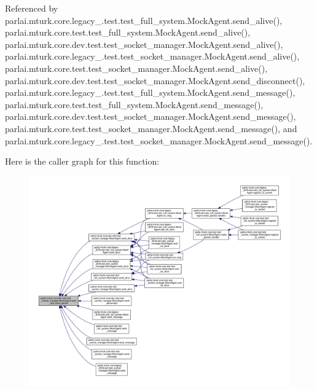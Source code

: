 Referenced by parlai.\+mturk.\+core.\+legacy\+\_.\+test.\+test\+\_\+full\+\_\+system.\+Mock\+Agent.\+send\+\_\+alive(), parlai.\+mturk.\+core.\+test.\+test\+\_\+full\+\_\+system.\+Mock\+Agent.\+send\+\_\+alive(), parlai.\+mturk.\+core.\+dev.\+test.\+test\+\_\+socket\+\_\+manager.\+Mock\+Agent.\+send\+\_\+alive(), parlai.\+mturk.\+core.\+legacy\+\_.\+test.\+test\+\_\+socket\+\_\+manager.\+Mock\+Agent.\+send\+\_\+alive(), parlai.\+mturk.\+core.\+test.\+test\+\_\+socket\+\_\+manager.\+Mock\+Agent.\+send\+\_\+alive(), parlai.\+mturk.\+core.\+dev.\+test.\+test\+\_\+socket\+\_\+manager.\+Mock\+Agent.\+send\+\_\+disconnect(), parlai.\+mturk.\+core.\+legacy\+\_.\+test.\+test\+\_\+full\+\_\+system.\+Mock\+Agent.\+send\+\_\+message(), parlai.\+mturk.\+core.\+test.\+test\+\_\+full\+\_\+system.\+Mock\+Agent.\+send\+\_\+message(), parlai.\+mturk.\+core.\+dev.\+test.\+test\+\_\+socket\+\_\+manager.\+Mock\+Agent.\+send\+\_\+message(), parlai.\+mturk.\+core.\+test.\+test\+\_\+socket\+\_\+manager.\+Mock\+Agent.\+send\+\_\+message(), and parlai.\+mturk.\+core.\+legacy\+\_.\+test.\+test\+\_\+socket\+\_\+manager.\+Mock\+Agent.\+send\+\_\+message().

Here is the caller graph for this function\+:
\nopagebreak
\begin{figure}[H]
\begin{center}
\leavevmode
\includegraphics[width=350pt]{classparlai_1_1mturk_1_1core_1_1dev_1_1test_1_1test__socket__manager_1_1MockAgent_a2add2b3e4edb6587b92db6bb6fe5c069_icgraph}
\end{center}
\end{figure}
\mbox{\label{classparlai_1_1mturk_1_1core_1_1dev_1_1test_1_1test__socket__manager_1_1MockAgent_ae9001fc0af7cfd2bf69429e88099149c}} 
